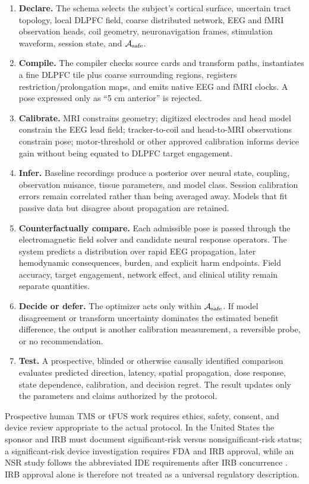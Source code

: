 \begin{enumerate}
\item \textbf{Declare.} The schema selects the subject's cortical surface,
  uncertain tract topology, local DLPFC field, coarse distributed network,
  EEG and fMRI observation heads, coil geometry, neuronavigation frames,
  stimulation waveform, session state, and \(\mathcal A_{\rm safe}\).
\item \textbf{Compile.} The compiler checks source cards and transform paths,
  instantiates a fine DLPFC tile plus coarse surrounding regions, registers
  restriction/prolongation maps, and emits native EEG and fMRI clocks. A pose
  expressed only as ``5 cm anterior'' is rejected.
\item \textbf{Calibrate.} MRI constrains geometry; digitized electrodes and
  head model constrain the EEG lead field; tracker-to-coil and head-to-MRI
  observations constrain pose; motor-threshold or other approved calibration
  informs device gain without being equated to DLPFC target engagement.
\item \textbf{Infer.} Baseline recordings produce a posterior over neural
  state, coupling, observation nuisance, tissue parameters, and model class.
  Session calibration errors remain correlated rather than being averaged
  away. Models that fit passive data but disagree about propagation are
  retained.
\item \textbf{Counterfactually compare.} Each admissible pose is passed through
  the electromagnetic field solver and candidate neural response operators.
  The system predicts a distribution over rapid EEG propagation, later
  hemodynamic consequences, burden, and explicit harm endpoints. Field
  accuracy, target engagement, network effect, and clinical utility remain
  separate quantities.
\item \textbf{Decide or defer.} The optimizer acts only within
  \(\mathcal A_{\rm safe}\). If model disagreement or transform uncertainty
  dominates the estimated benefit difference, the output is another
  calibration measurement, a reversible probe, or no recommendation.
\item \textbf{Test.} A prospective, blinded or otherwise causally identified
  comparison evaluates predicted direction, latency, spatial propagation,
  dose response, state dependence, calibration, and decision regret. The
  result updates only the parameters and claims authorized by the protocol.
\end{enumerate}

Prospective human TMS or tFUS work requires ethics, safety, consent, and device
review appropriate to the actual protocol. In the United States the sponsor
and IRB must document significant-risk versus nonsignificant-risk status; a
significant-risk device investigation requires FDA and IRB approval, while an
NSR study follows the abbreviated IDE requirements after IRB concurrence
\citep{fdaide}. IRB approval alone is therefore not treated as a universal
regulatory description.

